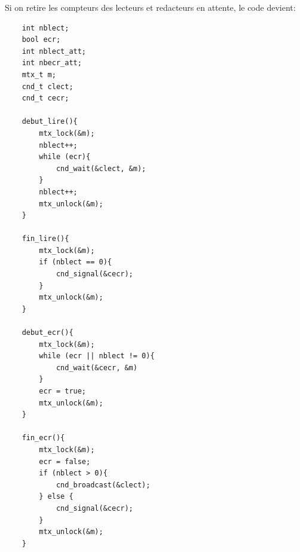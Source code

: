 \documentclass[11pt]{article}
\begin{document}
Si on retire les compteurs des lecteurs et redacteurs en attente, le code devient:
\begin{verbatim}
	int nblect;
	bool ecr;
	int nblect_att;
	int nbecr_att;
	mtx_t m;
	cnd_t clect;
	cnd_t cecr;

	debut_lire(){
		mtx_lock(&m);
		nblect++;
		while (ecr){
			cnd_wait(&clect, &m);
		}
		nblect++;
		mtx_unlock(&m);
	}

	fin_lire(){
		mtx_lock(&m);
		if (nblect == 0){
			cnd_signal(&cecr);
		}
		mtx_unlock(&m);
	}

	debut_ecr(){
		mtx_lock(&m);
		while (ecr || nblect != 0){
			cnd_wait(&cecr, &m)
		}
		ecr = true;
		mtx_unlock(&m);
	}

	fin_ecr(){
		mtx_lock(&m);
		ecr = false;
		if (nblect > 0){
			cnd_broadcast(&clect);
		} else {
			cnd_signal(&cecr);
		}
		mtx_unlock(&m);
	}
\end{verbatim}
\end{document}
